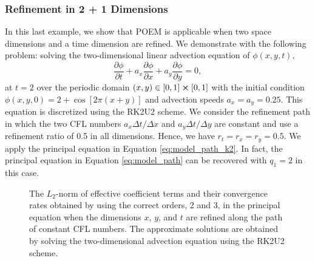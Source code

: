 \subsubsection{Refinement in 2 + 1 Dimensions} \label{subsec:2+1_dim}
In this last example, we show that POEM is applicable when two space dimensions and a time dimension are refined. We demonstrate with the following problem: solving the two-dimensional linear advection equation of $\phi(x,y,t)$,
\begin{equation}
    \frac{\partial \phi}{\partial t} + a_x \frac{\partial \phi}{\partial x} + a_y \frac{\partial \phi}{\partial y} = 0,
\end{equation}
at $t = 2$ over the periodic domain $(x,y) \in [0,1] \cross [0,1]$ with the initial condition $\phi(x,y,0) = 2 + \cos[2\pi (x + y)]$ and advection speeds $a_x = a_y = 0.25$. This equation is discretized using the RK2U2 scheme. We consider the refinement path in which the two CFL numbers $a_x \Delta t / \Delta x$ and $a_y \Delta t / \Delta y$ are constant and use a refinement ratio of 0.5 in all dimensions. Hence, we have $r_t = r_x = r_y = 0.5$. We apply the principal equation in Equation \ref{eq:model_path_k2}. In fact, the principal equation in Equation \ref{eq:model_path} can be recovered with $q_1 = 2$ in this case.

\begin{figure}[!htb]
\centering
{}
\hskip 20pt
\caption{The $L_2$-norm of effective coefficient terms and their convergence rates obtained by using the correct orders, 2 and 3, in the principal equation when the dimensions $x$, $y$, and $t$ are refined along the path of constant CFL numbers. The approximate solutions are obtained by solving the two-dimensional advection equation using the RK2U2 scheme.}
\label{fig:cNorm-2D-RK2U2-c}
\end{figure}

